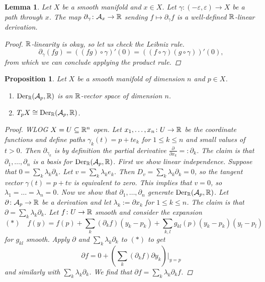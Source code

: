 \documentclass[A4paper, british, reqno]{amsart}
\theoremstyle{darkgreentheorem}
\newtheorem{lm}[thm]{Lemma}
\newtheorem{prop}[thm]{Proposition}
\theoremstyle{darkbluedefinition}
\theoremstyle{darkredexample}
\theoremstyle{remark}
\DeclareMathOperator{\Der}{Der}
\newcommand{\1}{\mathbbm{1}}
\newcommand{\sub}{\subseteq}
\begin{document}
\begin{lm}
    Let $X$ be a smooth manifold and $x\in X$.
    Let $\gamma\colon (-\varepsilon, \varepsilon)\to X$ be a path through $x$.
    The map $\partial_{\gamma}\colon \mathcal{A}_{x}\to \mathbb{R}$ sending $f\mapsto \partial_{\gamma}f$ is a well-defined $\mathbb{R}$-linear derivation.
    \begin{proof}
	$\mathbb{R}$-linearity is okay, so let us check the Leibniz rule.
	\[ \partial_{\gamma}(fg)=((fg)\circ \gamma)'(0)=((f\circ \gamma)(g\circ \gamma))'(0),\]
	from which we can conclude applying the product rule.
    \end{proof}
\end{lm}

\begin{prop}
    Let $X$ be a smooth manifold of dimension $n$ and $p\in X$.
    \begin{enumerate}
	\item $\Der_{\R}(\calA_{p},\R)$ is an $\mathbb{R}$-vector space of dimension $n$.
	\item $T_{p}X\cong \Der_{\R}(\calA_{p},\R)$.
    \end{enumerate}
    \begin{proof}
	WLOG $X=U\sub \R^{n}$ open.
	Let $x_{1},\ldots,x_{n}\colon U\to \mathbb{R}$ be the coordinate functions and define paths $\gamma_{k}(t)=p+te_{k}$ for $1\leqslant k\leqslant n$ and small values of $t>0$.
	Then $\partial_{\gamma_{k}}$ is by definition the partial derivative $\frac{\partial}{\partial x_{k}}=:\partial_{k}$.
	The claim is that $\partial_{1},\ldots,\partial_{n}$ is a basis for $\Der_{\R}(\calA_{p},\R)$.
	First we show linear independence.
	Suppose that $0=\sum_{k}\lambda_{k}\partial_{k}$.
	Let $v=\sum_{k}\lambda_{k}e_{k}$.
	Then $D_{v}=\sum_{k}\lambda_{k}\partial_{k}=0$, so the tangent vector $\gamma(t)=p+tv$ is equivalent to zero.
	This implies that $v=0$, so $\lambda_{1}=\ldots=\lambda_{n}=0$.
	Now we show that $\partial_{1},\ldots,\partial_{n}$ generate $\Der_{\R}(\calA_{p},\R)$.
	Let $\partial\colon \mathcal{A}_{p}\to \mathbb{R}$ be a derivation and let $\lambda_{k}:=\partial x_{k}$ for $1\leqslant k\leqslant n$.
	The claim is that $\partial =\sum_{k}\lambda_{k}\partial_{k}$.
	Let $f\colon U\to \mathbb{R}$ smooth and consider the expansion
	\[ (*)\quad f(y)=f(p)+\sum_{k}(\partial_{k}f)(y_{k}-p_{k})+\sum_{k,l}g_{kl}(p)(y_{k}-p_{k})(y_{l}-p_{l}) \]
	for $g_{kl}$ smooth.
	Apply $\partial $ and $\sum_{k}\lambda_{k}\partial_{k}$ to $(*)$ to get
	\[ \partial f=0+(\sum_{k}(\partial_{k} f)\partial y_{k})|_{y=p} \]
	and similarly with $\sum_{k}\lambda_{k}\partial_{k}$.
	We find that $\partial f=\sum_{k}\lambda_{k}\partial_{k} f$.
    \end{proof}
\end{prop}
\end{document}
